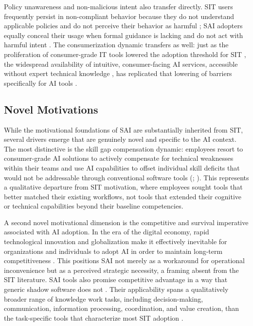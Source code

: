 \documentclass[12pt,oneside]{article}
\begin{document}
Policy unawareness and non-malicious intent also transfer directly. \ac{SIT} users frequently persist in non-compliant behavior because they do not understand applicable policies and do not perceive their behavior as harmful \citep[277-279]{silic2014shadow}; \ac{SAI} adopters equally conceal their usage when formal guidance is lacking and do not act with harmful intent \citep[2]{varshini2025facing}. The consumerization dynamic transfers as well: just as the proliferation of consumer-grade \ac{IT} tools lowered the adoption threshold for \ac{SIT} \citep[8]{thatte2012feral}, the widespread availability of intuitive, consumer-facing \ac{AI} services, accessible without expert technical knowledge \citep[436]{mallmann2021mediating}, has replicated that lowering of barriers specifically for \ac{AI} tools \citep[973]{puthal2025shadowai}.

\subsection{Novel Motivations} \label{novel-motivational-dimensions}

While the motivational foundations of \ac{SAI} are substantially inherited from \ac{SIT}, several drivers emerge that are genuinely novel and specific to the \ac{AI} context. The most distinctive is the skill gap compensation dynamic: employees resort to consumer-grade \ac{AI} solutions to actively compensate for technical weaknesses within their teams and use \ac{AI} capabilities to offset individual skill deficits that would not be addressable through conventional software tools (\citealp[1-2]{ross2025shadowai}; \citealp[3]{an2024impact}). This represents a qualitative departure from \ac{SIT} motivation, where employees sought tools that better matched their existing workflows, not tools that extended their cognitive or technical capabilities beyond their baseline competencies.

A second novel motivational dimension is the competitive and survival imperative associated with \ac{AI} adoption. In the era of the digital economy, rapid technological innovation and globalization make it effectively inevitable for organizations and individuals to adopt \ac{AI} in order to maintain long-term competitiveness \citep[1]{an2024impact}. This positions \ac{SAI} not merely as a workaround for operational inconvenience but as a perceived strategic necessity, a framing absent from the \ac{SIT} literature. \ac{SAI} tools also promise competitive advantage in a way that generic shadow software does not \citep[973]{puthal2025shadowai}. Their applicability spans a qualitatively broader range of knowledge work tasks, including decision-making, communication, information processing, coordination, and value creation, than the task-specific tools that characterize most \ac{SIT} adoption \citep[11]{alter2024updated}.
\end{document}
